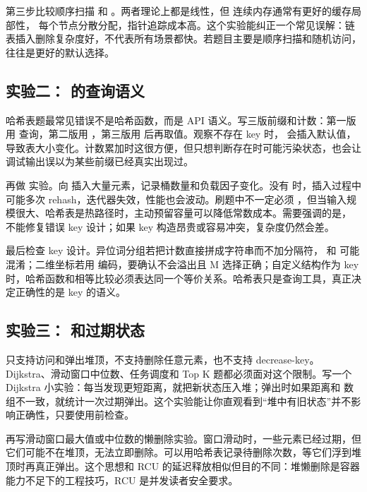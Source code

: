 第三步比较顺序扫描  和 。两者理论上都是线性，但  连续内存通常有更好的缓存局部性， 每个节点分散分配，指针追踪成本高。这个实验能纠正一个常见误解：链表插入删除复杂度好，不代表所有场景都快。若题目主要是顺序扫描和随机访问， 往往是更好的默认选择。

\subsection{实验二： 的查询语义}

哈希表题最常见错误不是哈希函数，而是 API 语义。写三版前缀和计数：第一版用  查询，第二版用 ，第三版用  后再取值。观察不存在 key 时， 会插入默认值，导致表大小变化。计数累加时这很方便，但只想判断存在时可能污染状态，也会让调试输出误以为某些前缀已经真实出现过。

再做  实验。向  插入大量元素，记录桶数量和负载因子变化。没有  时，插入过程中可能多次 rehash，迭代器失效，性能也会波动。刷题中不一定必须 ，但当输入规模很大、哈希表是热路径时，主动预留容量可以降低常数成本。需要强调的是， 不能修复错误 key 设计；如果 key 构造昂贵或容易冲突，复杂度仍然会差。

最后检查 key 设计。异位词分组若把计数直接拼成字符串而不加分隔符， 和  可能混淆；二维坐标若用  编码，要确认不会溢出且 M 选择正确；自定义结构作为 key 时，哈希函数和相等比较必须表达同一个等价关系。哈希表只是查询工具，真正决定正确性的是 key 的语义。

\subsection{实验三： 和过期状态}

 只支持访问和弹出堆顶，不支持删除任意元素，也不支持 decrease-key。Dijkstra、滑动窗口中位数、任务调度和 Top K 题都必须面对这个限制。写一个 Dijkstra 小实验：每当发现更短距离，就把新状态压入堆；弹出时如果距离和  数组不一致，就统计一次过期弹出。这个实验能让你直观看到“堆中有旧状态”并不影响正确性，只要使用前检查。

再写滑动窗口最大值或中位数的懒删除实验。窗口滑动时，一些元素已经过期，但它们可能不在堆顶，无法立即删除。可以用哈希表记录待删除次数，等它们浮到堆顶时再真正弹出。这个思想和 RCU 的延迟释放相似但目的不同：堆懒删除是容器能力不足下的工程技巧，RCU 是并发读者安全要求。

